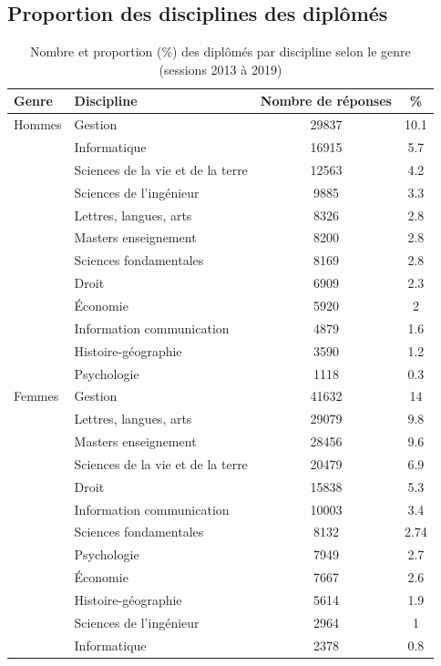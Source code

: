 \documentclass[12pt, a4paper, titlepage, table]{article}
\begin{document}
\subsection{Proportion des disciplines des diplômés}

	\begin{table}[H]
		\centering
		\begin{tabular}{llcc}
			\toprule
			\textbf{Genre} & \textbf{Discipline} & \textbf{Nombre de réponses} & \textbf{\%} \\
			\midrule
			Hommes & Gestion & 29837 & 10.1 \\
			& Informatique & 16915 & 5.7 \\
			& Sciences de la vie et de la terre & 12563 & 4.2 \\
			& Sciences de l'ingénieur & 9885 & 3.3 \\
			& Lettres, langues, arts & 8326 & 2.8 \\
			& Masters enseignement & 8200 & 2.8 \\
			& Sciences fondamentales & 8169 & 2.8 \\
			& Droit & 6909 & 2.3 \\
			& Économie & 5920 & 2 \\
			& Information communication & 4879 & 1.6 \\
			& Histoire-géographie & 3590 & 1.2 \\
			& Psychologie & 1118 & 0.3 \\
			\midrule
			Femmes & Gestion & 41632 & 14 \\
			& Lettres, langues, arts & 29079 & 9.8 \\
			& Masters enseignement & 28456 & 9.6 \\
			& Sciences de la vie et de la terre & 20479 & 6.9 \\
			& Droit & 15838 & 5.3 \\
			& Information communication & 10003 & 3.4 \\
			& Sciences fondamentales & 8132 & 2.74 \\
			& Psychologie & 7949 & 2.7 \\
			& Économie & 7667 & 2.6 \\
			& Histoire-géographie & 5614 & 1.9 \\
			& Sciences de l'ingénieur & 2964 & 1 \\
			& Informatique & 2378 & 0.8 \\
			\bottomrule
		\end{tabular}
		\caption{Nombre et proportion (\%) des diplômés par discipline selon le genre (sessions 2013 à 2019)}
		\label{tab:genre_discipline}
	\end{table}
\end{document}
